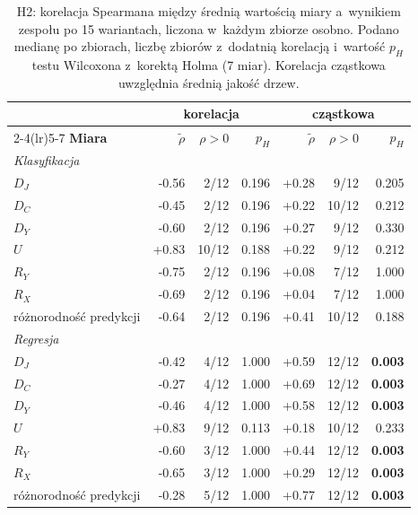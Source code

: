 \begin{table}[!htbp]
\centering\small
\caption{H2: korelacja Spearmana między średnią wartością miary a~wynikiem zespołu po 15 wariantach, liczona w~każdym zbiorze osobno. Podano medianę po zbiorach, liczbę zbiorów z~dodatnią korelacją i~wartość $p_H$ testu Wilcoxona z~korektą Holma (7 miar). Korelacja cząstkowa uwzględnia średnią jakość drzew.}
\label{tab:h2}
\begin{tabular}{lrrrrrr}
\toprule
& \multicolumn{3}{c}{\textbf{korelacja}} & \multicolumn{3}{c}{\textbf{cząstkowa}} \\
\cmidrule(lr){2-4}\cmidrule(lr){5-7}
\textbf{Miara} & $\tilde\rho$ & $\rho>0$ & $p_H$ & $\tilde\rho$ & $\rho>0$ & $p_H$ \\
\midrule
\multicolumn{7}{l}{\emph{Klasyfikacja}}\\
$D_J$ & -0.56 & 2/12 & 0.196 & +0.28 & 9/12 & 0.205 \\
$D_C$ & -0.45 & 2/12 & 0.196 & +0.22 & 10/12 & 0.212 \\
$D_Y$ & -0.60 & 2/12 & 0.196 & +0.27 & 9/12 & 0.330 \\
$U$ & +0.83 & 10/12 & 0.188 & +0.22 & 9/12 & 0.212 \\
$R_Y$ & -0.75 & 2/12 & 0.196 & +0.08 & 7/12 & 1.000 \\
$R_X$ & -0.69 & 2/12 & 0.196 & +0.04 & 7/12 & 1.000 \\
różnorodność predykcji & -0.64 & 2/12 & 0.196 & +0.41 & 10/12 & 0.188 \\
\midrule
\multicolumn{7}{l}{\emph{Regresja}}\\
$D_J$ & -0.42 & 4/12 & 1.000 & +0.59 & 12/12 & \textbf{0.003} \\
$D_C$ & -0.27 & 4/12 & 1.000 & +0.69 & 12/12 & \textbf{0.003} \\
$D_Y$ & -0.46 & 4/12 & 1.000 & +0.58 & 12/12 & \textbf{0.003} \\
$U$ & +0.83 & 9/12 & 0.113 & +0.18 & 10/12 & 0.233 \\
$R_Y$ & -0.60 & 3/12 & 1.000 & +0.44 & 12/12 & \textbf{0.003} \\
$R_X$ & -0.65 & 3/12 & 1.000 & +0.29 & 12/12 & \textbf{0.003} \\
różnorodność predykcji & -0.28 & 5/12 & 1.000 & +0.77 & 12/12 & \textbf{0.003} \\
\bottomrule
\end{tabular}
\end{table}
